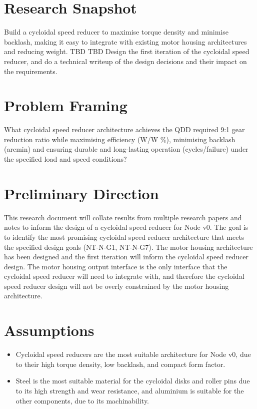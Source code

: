\documentclass[internal]{../../classes/nervtech-research}
\begin{document}
\maketitle
\tableofcontents
\newpage

\section{Research Snapshot}
\researchsnapshot
{Build a cycloidal speed reducer to maximise torque density and minimise backlash, making it easy to integrate with existing motor housing architectures and reducing weight.}
{TBD}
{TBD}
{Design the first iteration of the cycloidal speed reducer, and do a technical writeup of the design decisions and their impact on the requirements.}

\section{Problem Framing}
\begin{researchquestion}
  What cycloidal speed reducer architecture achieves the QDD required 9:1 gear reduction ratio while maximising efficiency (W/W \%), minimising backlash (arcmin) and ensuring durable and long-lasting operation (cycles/failure) under the specified load and speed conditions?
\end{researchquestion}

\section{Preliminary Direction}
This research document will collate results from multiple research papers and notes to inform the design of a cycloidal speed reducer for Node v0.
The goal is to identify the most promising cycloidal speed reducer architecture that meets the specified design goals (NT-N-G1, NT-N-G7).
The motor housing architecture has been designed and the first iteration will inform the cycloidal speed reducer design.
The motor housing output interface is the only interface that the cycloidal speed reducer will need to integrate with, and therefore the cycloidal speed reducer design will not be overly constrained by the motor housing architecture.

\section{Assumptions}
\begin{itemize}
  \item Cycloidal speed reducers are the most suitable architecture for Node v0, due to their high torque density, low backlash, and compact form factor.
  \item Steel is the most suitable material for the cycloidal disks and roller pins due to its high strength and wear resistance, and aluminium is suitable for the other components, due to its machinability.
\end{itemize}
\end{document}
